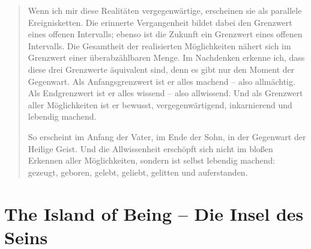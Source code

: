 \documentclass[
  ngerman,
]{article}
\begin{document}
\begin{quote}
Wenn ich mir diese Realitäten vergegenwärtige, erscheinen sie als
parallele Ereignisketten. Die erinnerte Vergangenheit bildet dabei den
Grenzwert eines offenen Intervalls; ebenso ist die Zukunft ein Grenzwert
eines offenen Intervalls. Die Gesamtheit der realisierten Möglichkeiten
nähert sich im Grenzwert einer überabzählbaren Menge. Im Nachdenken
erkenne ich, dass diese drei Grenzwerte äquivalent sind, denn es gibt
nur den Moment der Gegenwart. Als Anfangsgrenzwert ist er alles machend
-- also allmächtig. Als Endgrenzwert ist er alles wissend -- also
allwissend. Und als Grenzwert aller Möglichkeiten ist er bewusst,
vergegenwärtigend, inkarnierend und lebendig machend.

So erscheint im Anfang der Vater, im Ende der Sohn, in der Gegenwart der
Heilige Geist. Und die Allwissenheit erschöpft sich nicht im bloßen
Erkennen aller Möglichkeiten, sondern ist selbst lebendig machend:
gezeugt, geboren, gelebt, geliebt, gelitten und auferstanden.
\end{quote}

\section{\texorpdfstring{\textbf{The Island of Being -- Die Insel des
Seins}}{The Island of Being -- Die Insel des Seins}}\label{the-island-of-being-die-insel-des-seins}
\end{document}
